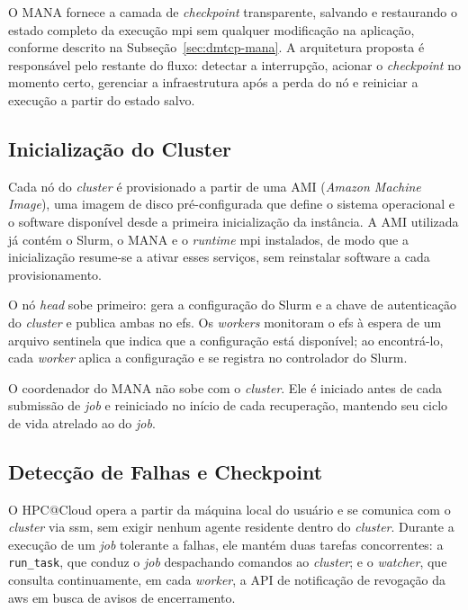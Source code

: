 \documentclass[a4paper,11pt]{article}
\begin{document}
            O MANA fornece a camada de \textit{checkpoint} transparente, salvando e
            restaurando o estado completo da execução \gls{mpi} sem qualquer modificação
            na aplicação, conforme descrito na Subseção~\ref{sec:dmtcp-mana}. A
            arquitetura proposta é responsável pelo restante do fluxo: detectar a
            interrupção, acionar o \textit{checkpoint} no momento certo, gerenciar a
            infraestrutura após a perda do nó e reiniciar a execução a partir do estado
            salvo.

        \subsection{Inicialização do Cluster}
        \label{sec:init}

            Cada nó do \textit{cluster} é provisionado a partir de uma AMI
            (\textit{Amazon Machine Image}), uma imagem de disco pré-configurada que
            define o sistema operacional e o software disponível desde a primeira
            inicialização da instância. A AMI utilizada já contém o Slurm, o MANA e o
            \textit{runtime} \gls{mpi} instalados, de modo que a inicialização resume-se
            a ativar esses serviços, sem reinstalar software a cada provisionamento.

            O nó \textit{head} sobe primeiro: gera a configuração do Slurm e a chave
            de autenticação do \textit{cluster} e publica ambas no \gls{efs}. Os
            \textit{workers} monitoram o \gls{efs} à espera de um arquivo sentinela
            que indica que a configuração está disponível; ao encontrá-lo, cada
            \textit{worker} aplica a configuração e se registra no controlador do
            Slurm.

            O coordenador do MANA não sobe com o \textit{cluster}. Ele é iniciado
            antes de cada submissão de \textit{job} e reiniciado no início de cada
            recuperação, mantendo seu ciclo de vida atrelado ao do \textit{job}.

        \subsection{Detecção de Falhas e Checkpoint}
        \label{sec:detection}

            O HPC@Cloud opera a partir da máquina local do usuário e se comunica
            com o \textit{cluster} via \gls{ssm}, sem exigir nenhum agente residente
            dentro do \textit{cluster}. Durante a execução de um \textit{job} tolerante
            a falhas, ele mantém duas tarefas concorrentes: a \texttt{run\_task}, que
            conduz o \textit{job} despachando comandos ao \textit{cluster}; e o
            \textit{watcher}, que consulta continuamente, em cada \textit{worker}, a
            API de notificação de revogação da \gls{aws} em busca de avisos de
            encerramento.
\end{document}
